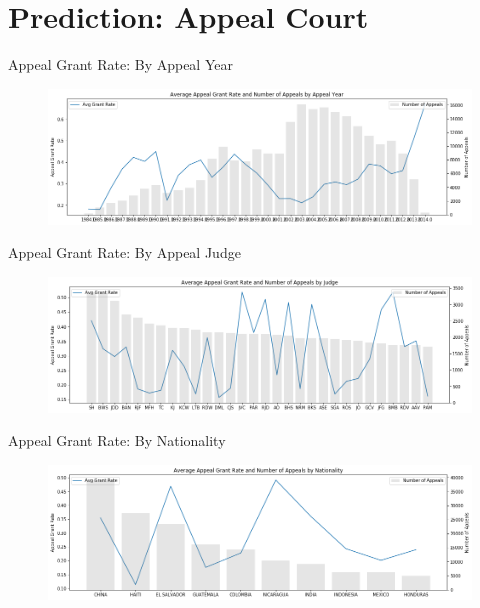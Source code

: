 \section{Prediction: Appeal Court}

 \frame{\sectionpage}

\begin{frame}{Appeal Grant Rate: By Appeal Year}
    \begin{figure}
        \centering
        \includegraphics[width = \textwidth]{images/grant_rate_by_appeal_year.png}
        \end{figure}
    
\end{frame}

\begin{frame}{Appeal Grant Rate: By Appeal Judge}
    \begin{figure}
        \centering
        \includegraphics[width = \textwidth]{images/grant_rate_by_judge.png}
        \end{figure}
    
\end{frame}

\begin{frame}{Appeal Grant Rate: By Nationality}
    \begin{figure}
        \centering
        \includegraphics[width = \textwidth]{images/grant_rate_by_nationality.png}
        \end{figure}
    
\end{frame}

